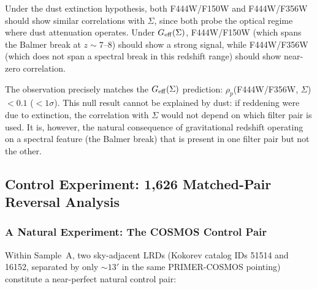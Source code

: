 \documentclass[apj,twocolumn,longbibliography,linenumbers]{aastex701}
\begin{document}
Under the dust extinction hypothesis, both F444W/F150W and F444W/F356W should show similar correlations with $\Sigma$, since both probe the optical regime where dust attenuation operates. Under $G_{\rm eff}(\Sigma)$, F444W/F150W (which spans the Balmer break at $z \sim 7$--$8$) should show a strong signal, while F444W/F356W (which does not span a spectral break in this redshift range) should show near-zero correlation.

The observation precisely matches the $G_{\rm eff}(\Sigma)$ prediction: $\rho_p$(F444W/F356W, $\Sigma$) $< 0.1$ ($<1\sigma$). This null result cannot be explained by dust: if reddening were due to extinction, the correlation with $\Sigma$ would not depend on which filter pair is used. It is, however, the natural consequence of gravitational redshift operating on a spectral feature (the Balmer break) that is present in one filter pair but not the other.

\subsection{Control Experiment: 1,626 Matched-Pair Reversal Analysis}

\subsubsection{A Natural Experiment: The COSMOS Control Pair}

Within Sample~A, two sky-adjacent LRDs (Kokorev catalog IDs 51514 and 16152, separated by only ${\sim}13'$ in the same PRIMER-COSMOS pointing) constitute a near-perfect natural control pair:

\begin{table}[h]
\caption{The COSMOS Control Pair}
\label{tab:cosmos_control}
\centering
\small
{}
\end{table}
\end{document}

